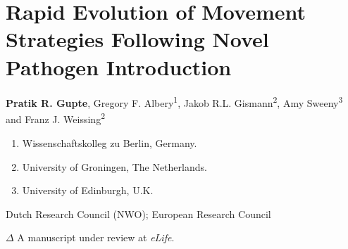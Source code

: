 \chapter{Rapid Evolution of Movement Strategies Following Novel Pathogen Introduction}\label{ch:pathomove}

{\noindent \textbf{Pratik R. Gupte}, Gregory F. Albery\textsuperscript{1}, Jakob R.L. Gismann\textsuperscript{2}, Amy Sweeny\textsuperscript{3} and Franz J. Weissing\textsuperscript{2}}

\medskip

    {\color{Maroon}\normalsize{}}

    \begin{enumerate}
        \item Wissenschaftskolleg zu Berlin, Germany.
        \item University of Groningen, The Netherlands.
        \item University of Edinburgh, U.K.
    \end{enumerate}

    \medskip

    {\color{Maroon}\normalsize{}}

    Dutch Research Council (NWO); European Research Council

    \bigskip

    {\noindent \large{$\Delta$}} A manuscript under review at \textit{eLife}.

\clearpage